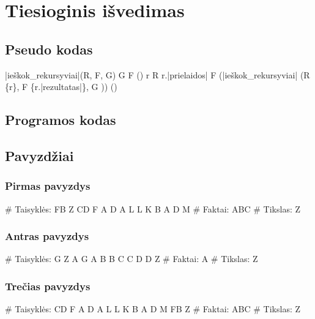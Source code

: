 \chapter{Tiesioginis išvedimas}

\section{Pseudo kodas}

\begin{program}
  \FUNCT |ieškok_rekursyviai|(R, F, G) \BODY
    \IF G \in F \THEN \EXIT(\true) \FI
    \FOREACH r \in R \DO
      \IF r.|prielaidos| \subseteq F
      \THEN \EXIT(|ieškok_rekursyviai|%
        (R \setminus \{r\}, F \cup \{r.|rezultatas|\}, G ))
      \FI
    \OD
    \EXIT(\false)%
  \ENDFUNCT
\end{program}

\section{Programos kodas}


\section{Pavyzdžiai}

\subsection{Pirmas pavyzdys}

\begin{pythonaienv}[fc]
# Taisyklės:
FB Z
CD F
A D
A L
L K
B A
D M
# Faktai:
ABC
# Tikslas:
Z
\end{pythonaienv}

\subsection{Antras pavyzdys}

\begin{pythonaienv}[fc]
# Taisyklės:
G Z
A G
A B
B C
C D
D Z
# Faktai:
A
# Tikslas:
Z
\end{pythonaienv}

\subsection{Trečias pavyzdys}

\begin{pythonaienv}[fc]
# Taisyklės:
CD F
A D
A L
L K
B A
D M
FB Z
# Faktai:
ABC
# Tikslas:
Z
\end{pythonaienv}
